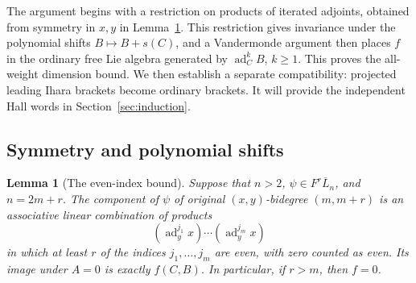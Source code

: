\documentclass[11pt]{article}
\DeclareMathOperator{\ad}{ad}
\newtheorem{lemma}[theorem]{Lemma}
\theoremstyle{definition}
\theoremstyle{remark}
\numberwithin{equation}{section}
\begin{document}
The argument begins with a restriction on products of iterated adjoints,
obtained from symmetry in $x,y$ in Lemma~\ref{lem:even-indices}.
This restriction gives invariance under the polynomial shifts
$B\mapsto B+s(C)$, and a Vandermonde argument then places $f$ in the
ordinary free Lie algebra generated by $\ad_C^kB$, $k\geq1$.
This proves the all-weight dimension bound.  We then establish a
separate compatibility: projected leading Ihara brackets become
ordinary brackets.  It will provide the independent Hall words in
Section~\ref{sec:induction}.

\subsection{Symmetry and polynomial shifts}

\begin{lemma}[The even-index bound]
\label{lem:even-indices}
Suppose that $n>2$, $\psi\in F^r\overline L_n$, and $n=2m+r$.
The component of $\psi$ of original $(x,y)$-bidegree $(m,m+r)$
is an associative linear combination of products
\begin{equation}
 \label{eq:swapped-products}
 (\ad_y^{j_1}x)\cdots(\ad_y^{j_m}x)
\end{equation}
in which at least $r$ of the indices $j_1,\ldots,j_m$ are even,
with zero counted as even.
Its image under $A=0$ is exactly $f(C,B)$.
In particular, if $r>m$, then $f=0$.
\end{lemma}
\end{document}
